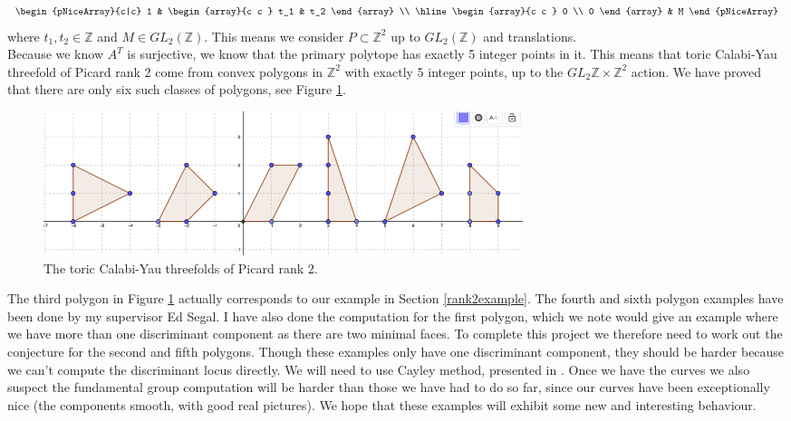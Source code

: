 \documentclass[oneside,reqno]{amsart}
\theoremstyle{definition}
\theoremstyle{definition}
\theoremstyle{definition}
\theoremstyle{definition}
\newcommand{\Z}{\mathbb{Z}}
\begin{document}
\[
\begin{pNiceArray}{c|c}
  1 & \begin{array}{c c } 
    t_1 & t_2
 \end{array} \\
  \hline
  \begin{array}{c c } 
    0 \\
    0
 \end{array} & M
\end{pNiceArray}
\]
where $t_1,t_2 \in \Z$ and $M \in GL_{2} (\Z)$. This means we consider $P\subset \Z^2$ up to $GL_{2} (\Z)$ and translations. \\
\newline
Because we know $A^T$ is surjective, we know that the primary polytope has exactly 5 integer points in it. This means that toric Calabi-Yau threefold of Picard rank 2 come from convex polygons in $\Z^2$ with exactly 5 integer points, up to the $GL_{2} \Z \times \Z^2$ action. We have proved that there are only six such classes of  polygons, see Figure \ref{CY3rank2}.
\begin{figure}[!h]
    \centering
    \includegraphics[width=14cm]{3foldsofpicardrank2.png}
    \caption{The toric Calabi-Yau threefolds of Picard rank 2.}
    \label{CY3rank2}
\end{figure}
The third polygon in Figure \ref{CY3rank2} actually corresponds to our example in Section \ref{rank2example}. The fourth and sixth polygon examples have been done by my supervisor Ed Segal. I have also done the computation for the first polygon, which we note would give an example where we have more than one discriminant component as there are two minimal faces. To complete this project we therefore need to work out the conjecture for the second and fifth polygons. Though these examples only have one discriminant component, they should be harder because we can't compute the discriminant locus directly. We will need to use Cayley method, presented in \cite[Chapter 2]{gelfand1994discriminants}. Once we have the curves we also suspect the fundamental group computation will be harder than those we have had to do so far, since our curves have been exceptionally nice (the components smooth, with good real pictures). We hope that these examples will exhibit some new and interesting behaviour. \\
\end{document}

